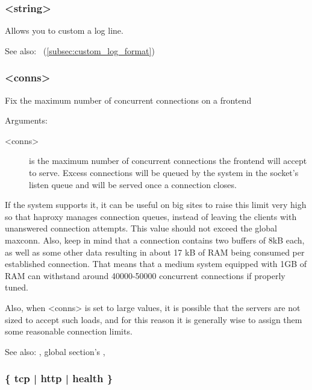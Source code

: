 \subsubsection[log-format]{ <string>}

   Allows you to custom a log line.


See also:~ (\ref{subsec:custom_log_format})

\subsubsection[maxconn]{ <conns>}

  Fix the maximum number of concurrent connections on a frontend


  Arguments:
\begin{description}
\item[<conns>]
              is the maximum number of concurrent connections the frontend will
              accept to serve. Excess connections will be queued by the system
              in the socket's listen queue and will be served once a connection
              closes.

\end{description}

  If the system supports it, it can be useful on big sites to raise this limit
  very high so that haproxy manages connection queues, instead of leaving the
  clients with unanswered connection attempts. This value should not exceed the
  global maxconn. Also, keep in mind that a connection contains two buffers
  of 8kB each, as well as some other data resulting in about 17 kB of RAM being
  consumed per established connection. That means that a medium system equipped
  with 1GB of RAM can withstand around 40000-50000 concurrent connections if
  properly tuned.

  Also, when <conns> is set to large values, it is possible that the servers
  are not sized to accept such loads, and for this reason it is generally wise
  to assign them some reasonable connection limits.


See also: , global section's , 

\subsubsection[mode]{ \{ tcp | http | health \}}

